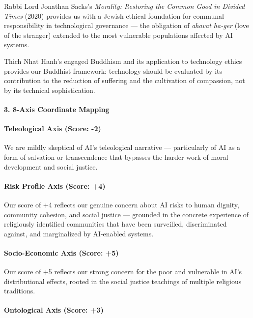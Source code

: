 Rabbi Lord Jonathan Sacks's \emph{Morality: Restoring the Common Good in
Divided Times} (2020) provides us with a Jewish ethical foundation for
communal responsibility in technological governance --- the obligation
of \emph{ahavat ha-ger} (love of the stranger) extended to the most
vulnerable populations affected by AI systems.

Thich Nhat Hanh's engaged Buddhism and its application to technology
ethics provides our Buddhist framework: technology should be evaluated
by its contribution to the reduction of suffering and the cultivation of
compassion, not by its technical sophistication.

\paragraph{3. 8-Axis Coordinate
Mapping}\label{axis-coordinate-mapping-35}

\paragraph{Teleological Axis (Score:
-2)}\label{teleological-axis-score--2-3}

We are mildly skeptical of AI's teleological narrative --- particularly
of AI as a form of salvation or transcendence that bypasses the harder
work of moral development and social justice.

\paragraph{Risk Profile Axis (Score:
+4)}\label{risk-profile-axis-score-4-1}

Our score of +4 reflects our genuine concern about AI risks to human
dignity, community cohesion, and social justice --- grounded in the
concrete experience of religiously identified communities that have been
surveilled, discriminated against, and marginalized by AI-enabled
systems.

\paragraph{Socio-Economic Axis (Score:
+5)}\label{socio-economic-axis-score-5-1}

Our score of +5 reflects our strong concern for the poor and vulnerable
in AI's distributional effects, rooted in the social justice teachings
of multiple religious traditions.

\paragraph{Ontological Axis (Score:
+3)}\label{ontological-axis-score-3-2}

